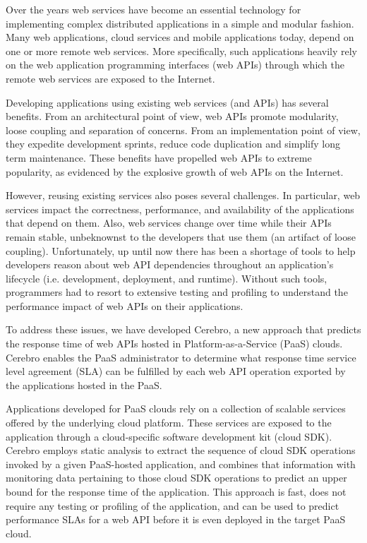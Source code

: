 Over the years web services have become an essential technology for implementing
complex distributed applications in a simple and modular fashion. Many web applications, cloud services and mobile
applications today, depend on one or more remote web services. More specifically, such
applications heavily rely on the web application programming interfaces (web APIs) through
which the remote web services are exposed to the Internet.

Developing applications using existing web services (and APIs) has several benefits. From an
architectural point of view, web APIs promote modularity, loose coupling and separation of concerns. From
an implementation point of view, they expedite development sprints, reduce code duplication and simplify
long term maintenance. These benefits have propelled web APIs to extreme popularity,
as evidenced by the explosive growth of web APIs on the Internet. 

However, reusing existing services also poses several challenges. In particular, web services
impact the correctness, performance, and availability of the
applications that depend on them. Also, web services change over time while their APIs remain 
stable, unbeknownst to the developers that use them (an artifact of loose coupling).
Unfortunately, up until now there has been a shortage of tools to help developers 
reason about web API dependencies throughout an application's 
lifecycle (i.e. development, deployment, and runtime).  Without such tools, 
programmers had to resort to extensive testing and profiling 
to understand the performance impact of web APIs on their applications.

To address these issues, we have developed Cerebro, a new approach that
predicts the response time of web APIs hosted in Platform-as-a-Service (PaaS) clouds.
Cerebro enables the PaaS administrator to determine what response time service level 
agreement (SLA) can be fulfilled by each web API operation exported by the applications
hosted in the PaaS. 

Applications developed for PaaS clouds rely on a collection of
scalable services offered by the underlying cloud platform. These services are exposed to
the application through a cloud-specific software development kit (cloud SDK). Cerebro
employs static analysis to extract the sequence of cloud SDK operations invoked by a
given PaaS-hosted application, and combines that information with monitoring
data pertaining to those cloud SDK operations to predict an upper bound for the response
time of the application. This approach is fast, does not require any testing or profiling
of the application, and can be used to predict performance SLAs for a web API before
it is even deployed in the target PaaS cloud.

